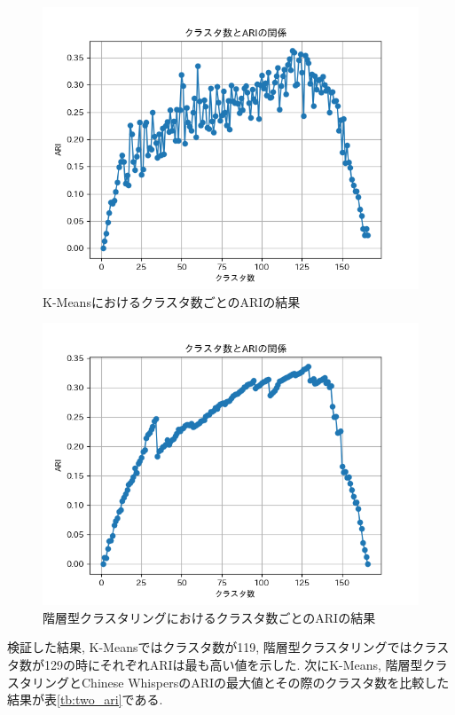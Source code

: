 \begin{figure}[H]
  \centering
  \includegraphics[scale=0.8]
    {contents/images/kmeans_graph.png}
  \caption{K-Meansにおけるクラスタ数ごとのARIの結果\label{fig:kmeans_graph}}
\end{figure}

\begin{figure}[H]
  \centering
  \includegraphics[scale=0.8]
    {contents/images/agg_graph.png}
  \caption{階層型クラスタリングにおけるクラスタ数ごとのARIの結果\label{fig:agg_graph}}
\end{figure}

検証した結果, K-Meansではクラスタ数が119, 階層型クラスタリングではクラスタ数が129の時にそれぞれARIは最も高い値を示した. 次にK-Means, 階層型クラスタリングとChinese WhispersのARIの最大値とその際のクラスタ数を比較した結果が表\ref{tb:two_ari}である. 

